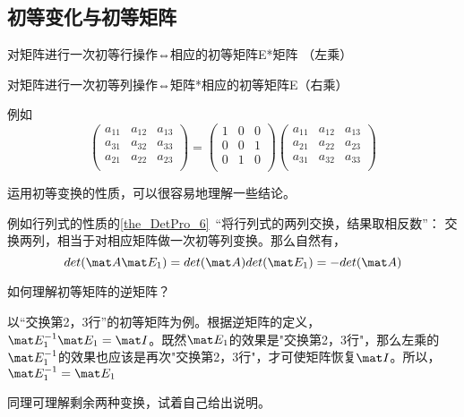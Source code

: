 \subsection{初等变化与初等矩阵}
\begin{theorem}{}
对矩阵进行一次初等行操作⇔相应的初等矩阵E*矩阵 （左乘）

对矩阵进行一次初等列操作⇔矩阵*相应的初等矩阵E（右乘）
\end{theorem}

\begin{example}{}
例如
\begin{equation}
\begin{pmatrix}
    a_{11} & a_{12} & a_{13}\\
    a_{31} & a_{32} & a_{33}\\
    a_{21} & a_{22} & a_{23}\\
\end{pmatrix}
=
    \begin{pmatrix}
        1 & 0 & 0\\
        0 & 0 & 1\\
        0 & 1 & 0\\
    \end{pmatrix}
\begin{pmatrix}
        a_{11} & a_{12} & a_{13}\\
        a_{21} & a_{22} & a_{23}\\
        a_{31} & a_{32} & a_{33}\\
\end{pmatrix}
\end{equation}
\end{example}

运用初等变换的性质，可以很容易地理解一些结论。

\begin{example}{}
例如行列式的性质的\autoref{the_DetPro_6}~“将行列式的两列交换，结果取相反数”： 交换两列，相当于对相应矩阵做一次初等列变换。那么自然有，
$$det (\mat A \mat E_1)=det (\mat A) det(\mat E_1)=-det (\mat A)$$
\end{example}

\begin{example}{}
如何理解初等矩阵的逆矩阵？

以“交换第2，3行”的初等矩阵为例。根据逆矩阵的定义，$\mat E_1^{-1} \mat E_1 = \mat I$。既然$\mat E_1$的效果是"交换第2，3行"，那么左乘的$\mat E_1^{-1}$的效果也应该是再次"交换第2，3行"，才可使矩阵恢复$\mat I$。所以，$\mat E_1^{-1} =  \mat E_1$

同理可理解剩余两种变换，试着自己给出说明。
\end{example}

